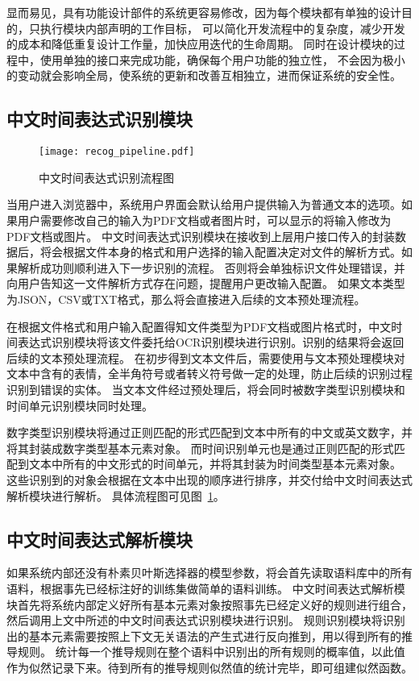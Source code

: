 显而易见，具有功能设计部件的系统更容易修改，因为每个模块都有单独的设计目的，只执行模块内部声明的工作目标，
可以简化开发流程中的复杂度，减少开发的成本和降低重复设计工作量，加快应用迭代的生命周期。
同时在设计模块的过程中，使用单独的接口来完成功能，确保每个用户功能的独立性，
不会因为极小的变动就会影响全局，使系统的更新和改善互相独立，进而保证系统的安全性。


\subsection{中文时间表达式识别模块}

\begin{figure}[h]
  \centering
  \texttt{[image: recog\_pipeline.pdf]}
  \caption{中文时间表达式识别流程图}
  \label{fig:recog_pipeline}
\end{figure}

当用户进入浏览器中，系统用户界面会默认给用户提供输入为普通文本的选项。如果用户需要修改自己的输入为PDF文档或者图片时，可以显示的将输入修改为PDF文档或图片。
中文时间表达式识别模块在接收到上层用户接口传入的封装数据后，将会根据文件本身的格式和用户选择的输入配置决定对文件的解析方式。如果解析成功则顺利进入下一步识别的流程。
否则将会单独标识文件处理错误，并向用户告知这一文件解析方式存在问题，提醒用户更改输入配置。
如果文本类型为JSON，CSV或TXT格式，那么将会直接进入后续的文本预处理流程。

在根据文件格式和用户输入配置得知文件类型为PDF文档或图片格式时，中文时间表达式识别模块将该文件委托给OCR识别模块进行识别。识别的结果将会返回后续的文本预处理流程。
在初步得到文本文件后，需要使用与文本预处理模块对文本中含有的表情，全半角符号或者转义符号做一定的处理，防止后续的识别过程识别到错误的实体。
当文本文件经过预处理后，将会同时被数字类型识别模块和时间单元识别模块同时处理。

数字类型识别模块将通过正则匹配的形式匹配到文本中所有的中文或英文数字，并将其封装成数字类型基本元素对象。
而时间识别单元也是通过正则匹配的形式匹配到文本中所有的中文形式的时间单元，并将其封装为时间类型基本元素对象。
这些识别到的对象会根据在文本中出现的顺序进行排序，并交付给中文时间表达式解析模块进行解析。
具体流程图可见图~\ref{fig:recog_pipeline}。

\subsection{中文时间表达式解析模块}

如果系统内部还没有朴素贝叶斯选择器的模型参数，将会首先读取语料库中的所有语料，根据事先已经标注好的训练集做简单的语料训练。
中文时间表达式解析模块首先将系统内部定义好所有基本元素对象按照事先已经定义好的规则进行组合，然后调用上文中所述的中文时间表达式识别模块进行识别。
规则识别模块将识别出的基本元素需要按照上下文无关语法的产生式进行反向推到，用以得到所有的推导规则。
统计每一个推导规则在整个语料中识别出的所有规则的概率值，以此值作为似然记录下来。待到所有的推导规则似然值的统计完毕，即可组建似然函数。

